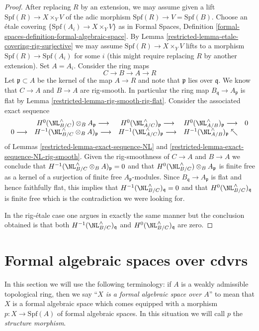 \begin{proof}
\medskip\noindent
After replacing $R$ by an extension, we may assume given a lift
$\text{Spf}(R) \to X \times_Y V$ of the adic morphism
$\text{Spf}(R) \to V = \text{Spf}(B)$. Choose an \'etale
covering $\{\text{Spf}(A_i) \to X \times_Y V\}$ as in
Formal Spaces, Definition
\ref{formal-spaces-definition-formal-algebraic-space}.
By Lemma \ref{restricted-lemma-etale-covering-rig-surjective}
we may assume $\text{Spf}(R) \to X \times_Y V$ lifts to a
morphism $\text{Spf}(R) \to \text{Spf}(A_i)$ for some $i$
(this might require replacing $R$ by another extension).
Set $A = A_i$. Consider the ring maps
$$
C \to B \to A \to R
$$
Let $\mathfrak p \subset A$ be the kernel of the map
$A \to R$ and note that $\mathfrak p$ lies over $\mathfrak q$.
We know that $C \to A$ and $B \to A$ are rig-smooth.
In particular the ring map $B_\mathfrak q \to A_\mathfrak p$
is flat by Lemma \ref{restricted-lemma-rig-smooth-rig-flat}.
Consider the associated exact sequence
$$
\begin{array}{ccccc} & H^0(\NL_{B/C}^\wedge) \otimes_B A_\mathfrak p \longrightarrow & H^0(\NL_{A/C}^\wedge)_\mathfrak p \longrightarrow & H^0(\NL_{A/B}^\wedge)_\mathfrak p \longrightarrow & 0 \\ 0 \longrightarrow & H^{-1}(\NL_{B/C}^\wedge \otimes_B A)_\mathfrak p \longrightarrow & H^{-1}(\NL_{A/C}^\wedge)_\mathfrak p \longrightarrow & H^{-1}(\NL_{A/B}^\wedge)_\mathfrak p \nwarrow & \end{array}
$$
of Lemmas \ref{restricted-lemma-exact-sequence-NL} and
\ref{restricted-lemma-exact-sequence-NL-rig-smooth}.
Given the rig-smoothness of $C \to A$ and $B \to A$
we conclude that $H^{-1}(\NL_{B/C}^\wedge \otimes_B A)_\mathfrak p = 0$
and that $H^0(\NL_{B/C}^\wedge) \otimes_B A_\mathfrak p$
is finite free as a kernel of a surjection of finite free
$A_\mathfrak p$-modules. Since $B_\mathfrak q \to A_\mathfrak p$
is flat and hence faithfully flat, this implies that
$H^{-1}(\NL_{B/C}^\wedge)_\mathfrak q = 0$
and that $H^0(\NL_{B/C}^\wedge)_\mathfrak q$
is finite free which is the contradiction we were looking for.

\medskip\noindent
In the rig-\'etale case one argues in exactly the same manner
but the conclusion obtained is that both
$H^{-1}(\NL_{B/C}^\wedge)_\mathfrak q$
and $H^0(\NL_{B/C}^\wedge)_\mathfrak q$ are zero.
\end{proof}

\section{Formal algebraic spaces over cdvrs}
\label{restricted-section-over-cdrv}
In this section we will use the following terminology:
if $A$ is a weakly admissible topological ring, then we
say ``{\it $X$ is a formal algebraic space over $A$}'' to mean that $X$
is a formal algebraic space which comes equipped with
a morphism $p : X \to \text{Spf}(A)$ of formal algebraic spaces.
In this situation we will call $p$ the {\it structure morphism}.

